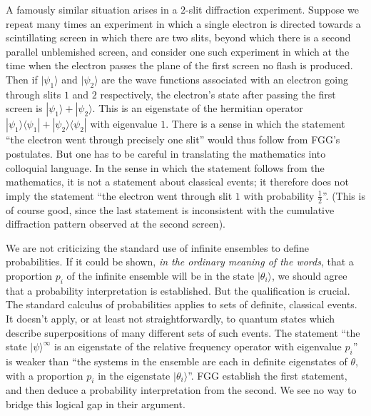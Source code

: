 \documentclass[aps,pra,12pt]{revtex4}
\def\bra#1{\langle #1 |}
\def\ket#1{| #1\rangle}
\begin{document}
A famously similar situation arises in a $2$-slit diffraction
experiment.  Suppose we repeat many times an experiment in which a
single electron is directed towards a scintillating screen in which
there are two slits, beyond which there is a second parallel
unblemished screen, and consider one such experiment in which at 
the time when the electron passes the
plane of the first screen no flash is produced.  Then if
$\ket{\psi_1}$ and $\ket{\psi_2}$ are the wave functions associated
with an electron going through slits $1$ and $2$ respectively, the
electron's state after passing the first screen is $\ket{\psi_1} +
\ket{\psi_2}$.  This is an eigenstate of the hermitian operator
$\ket{\psi_1} \bra{\psi_1} + \ket{\psi_2} \bra{\psi_2}$ with
eigenvalue $1$.  There is a sense in which the statement ``the
electron went through precisely one slit'' would thus follow from
FGG's postulates.  But one has to be careful in translating the
mathematics into colloquial language.  In the sense in which the
statement follows from the mathematics, it is not a statement about
classical events; it therefore does not imply the statement ``the
electron went through slit $1$ with probability $\frac{1}{2}$''.
(This is of course good, since the last statement is inconsistent with
the cumulative diffraction pattern observed at the second screen).

We are not criticizing the standard use of infinite
ensembles to define probabilities. If it could be shown, {\em in the ordinary 
meaning of the words}, that a proportion $p_i$ of the infinite 
ensemble will be in the state $\ket{\theta_i}$, we should agree that a 
probability interpretation is established. 
But the qualification is crucial. The standard 
calculus of probabilities applies to sets of 
definite, classical events. It doesn't apply, or at least not 
straightforwardly, to quantum states which describe superpositions of many
different sets of such events. 
The statement ``the state $\ket{\psi}^{\infty}$ is an eigenstate of the 
relative frequency operator with eigenvalue $p_i$''
is weaker than ``the systems in the ensemble are each
in definite eigenstates of $\theta$, with a proportion $p_i$ in the 
eigenstate $\ket{\theta_i}$''. 
FGG establish the first statement, and then deduce a probability interpretation
from the second. We see no way to bridge this logical gap in their argument. 
\end{document}
